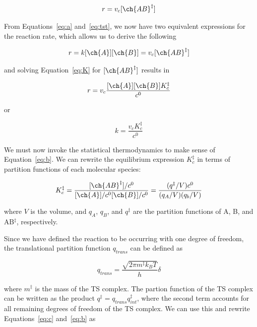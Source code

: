 \begin{equation}
  r = v_c [\ch{AB}^\ddagger]
\end{equation}

From Equations~\ref{eq:a} and~\ref{eq:tst}, we now have two equivalent expressions for the reaction rate, which allows us to derive the following

\begin{equation}
  r = k[\ch{A}][\ch{B}] = v_c [\ch{AB}^\ddagger]
\end{equation}

\noindent and solving Equation~\ref{eq:K} for $[\ch{AB}^\ddagger]$ results in


\begin{equation}
  r = v_c\frac{[\ch{A}][\ch{B}]K_c^\ddagger}{c^0}
\end{equation}

\noindent or

\begin{equation}
  k = \frac{v_c K_c^\ddagger}{c^0}
\label{eq:b}
\end{equation}

We must now invoke the statistical thermodynamics to make sense of Equation~\ref{eq:b}. We can rewrite the equilibrium expression $K_c^\ddagger$ in terms of partition functions of each molecular species:

\begin{equation}
    K_c^{\ddagger} = \frac{[\ch{AB}^\ddagger]/c^0}{[\ch{A}]/c^0[\ch{B}]/c^0}
    = \frac{(q^\ddagger/V)c^0}{(q_A/V)(q_b/V)}
\label{eq:c}
\end{equation}

\noindent where $V$ is the volume, and $q_A$, $q_B$, and $q^\ddagger$ are the partition functions of A, B, and AB$^\ddagger$, respectively.

Since we have defined the reaction to be occurring with one degree of freedom, the translational partition function $q_{trans}$ can be defined as

\begin{equation}
  q_{trans} = \frac{\sqrt{2\pi m^\ddagger k_B T}}{h}\delta
\end{equation}

\noindent where $m^\ddagger$ is the mass of the TS complex. The partion function of the TS complex can be written as the product $q^\ddagger = q_{trans}q_{int}^\ddagger$, where the second term accounts for all remaining degrees of freedom of the TS complex. We can use this and rewrite Equations~\ref{eq:c} and~\ref{eq:b} as


